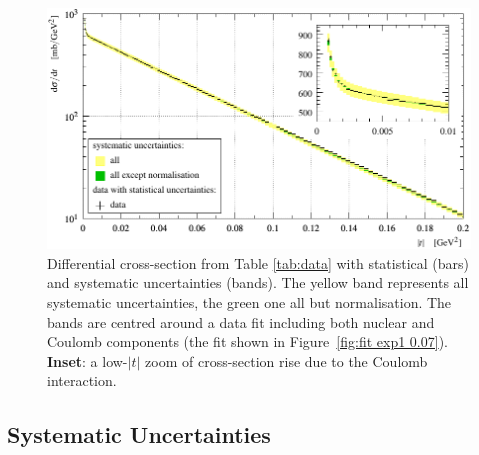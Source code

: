 \begin{figure}
\vskip-5mm
\begin{center}
\includegraphics{fig/t_dist_merged_with_unc.pdf}
\caption{%
Differential cross-section from Table \ref{tab:data} with statistical (bars) and systematic uncertainties (bands). The yellow band represents all systematic uncertainties, the green one all but normalisation. The bands are centred around a data fit including both nuclear and Coulomb components (the fit shown in Figure~\ref{fig:fit exp1 0.07}). {\bf Inset}: a low-$|t|$ zoom of cross-section rise due to the Coulomb interaction. 
}
\label{fig:dsdt}
\end{center}
\end{figure}



\subsection{Systematic Uncertainties}
\label{sec:systematics}

